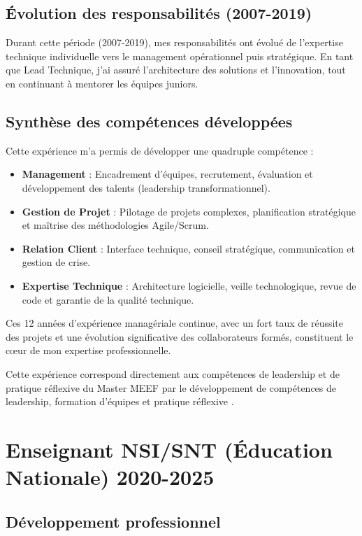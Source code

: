 \subsection{Évolution des responsabilités (2007-2019)}

Durant cette période (2007-2019), mes responsabilités ont évolué de l'expertise technique individuelle vers le management opérationnel puis stratégique. En tant que Lead Technique, j'ai assuré l'architecture des solutions et l'innovation, tout en continuant à mentorer les équipes juniors.

\subsection{Synthèse des compétences développées}

Cette expérience m'a permis de développer une quadruple compétence :
\begin{itemize}[leftmargin=*]
    \item \textbf{Management} : Encadrement d'équipes, recrutement, évaluation et développement des talents (leadership transformationnel).
    \item \textbf{Gestion de Projet} : Pilotage de projets complexes, planification stratégique et maîtrise des méthodologies Agile/Scrum.
    \item \textbf{Relation Client} : Interface technique, conseil stratégique, communication et gestion de crise.
    \item \textbf{Expertise Technique} : Architecture logicielle, veille technologique, revue de code et garantie de la qualité technique.
\end{itemize}

Ces 12 années d'expérience managériale continue, avec un fort taux de réussite des projets et une évolution significative des collaborateurs formés, constituent le cœur de mon expertise professionnelle.



Cette expérience correspond directement aux compétences de leadership et de pratique réflexive du Master MEEF par le développement de compétences de leadership, formation d'équipes et pratique réflexive \parencite{referentiel_meef}.

\section{Enseignant NSI/SNT (Éducation Nationale) 2020-2025}

\subsection{Développement professionnel}


